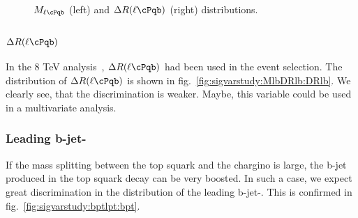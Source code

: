 \begin{figure}
\caption{\label{fig:sigvarstudy:MlbDRlb} $M_{\ell \cPqb}$ (left) and $\Delta R(\ell \cPqb)$ (right) distributions.}
\end{figure}

\subsubsection{$\Delta R(\ell\cPqb)$}

In the 8 TeV analysis~\cite{Chatrchyan:2013xna}, $\Delta R(\ell\cPqb)$ had been used in the event selection.
The distribution of $\Delta R(\ell \cPqb)$ is shown in fig.~\ref{fig:sigvarstudy:MlbDRlb:DRlb}. We clearly see, that the discrimination is weaker. Maybe, this variable could be used in a multivariate analysis.

\subsubsection{Leading b-jet-\pt}

If the mass splitting between the top squark and the chargino is large, the b-jet produced in the top squark decay can be very boosted. In such a case, we expect great discrimination in the distribution of the leading b-jet-\pt. This is confirmed in fig.~\ref{fig:sigvarstudy:bptlpt:bpt}.

